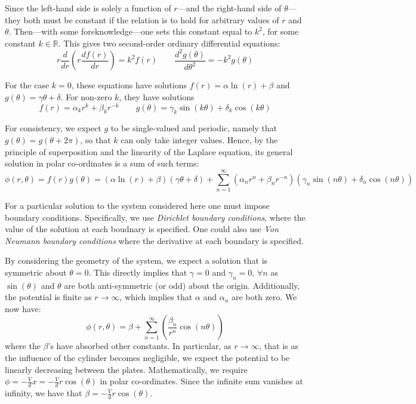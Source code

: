 \documentclass[12pt, a4paper]{article}
\newcommand{\be}{\begin{equation}}
\newcommand{\ee}{\end{equation}}
\begin{document}
Since the left-hand side is solely a function of $r$---and the right-hand side of
$\theta$---they both must be constant if the relation is to hold for arbitrary values
of $r$ and $\theta$. Then---with some foreknowledge---one sets this constant equal to
$k^2$, for some constant $k\in\mathbb{R}$. This gives two second-order ordinary
differential equations:
%
\be
r\frac{d}{dr}(r \frac{df(r)}{dr}) = k^2 f(r) \qquad
\frac{d^2 g(\theta)}{d\theta^2}=-k^2 g(\theta)
\ee

For the case $k=0$, these equations have solutions
$f(r)=\alpha \ln(r) + \beta$ and $g(\theta) = \gamma \theta + \delta$.
For non-zero $k$, they have solutions
%
\be
f(r)=\alpha_k r^k + \beta_k r^{-k}
\qquad
g(\theta)= \gamma_k \sin(k\theta)+\delta_k \cos(k\theta)
\ee

For consistency, we expect $g$ to be single-valued and periodic, namely that
$g(\theta)=g(\theta + 2\pi)$, so that $k$ can only take integer values. Hence, by
the principle of superposition and the linearity of the Laplace equation, its general
solution in polar co-ordinates is a sum of such terms:
%
\be
\phi(r,\theta)
= f(r)g(\theta)
= (\alpha \ln(r) + \beta)(\gamma\theta + \delta) + \sum_{n=1}^{\infty}(\alpha_n r^n+\beta_n r^{-n})(\gamma_n \sin(n\theta) + \delta_n \cos(n\theta))
\ee

For a particular solution to the system considered here one must impose boundary
conditions. Specifically, we use \emph{Dirichlet boundary conditions}, where the value
of the solution at each boudnary is specified. One could also use
\emph{Von Neumann boundary conditions} where the derivative at each boundary is
specified. 

By considering the geometry of the system, we expect a solution that is symmetric
about $\theta=0$. This directly implies that $\gamma = 0$ and $\gamma_n=0$, $\forall n$
as $\sin(\theta)$ and $\theta$ are both anti-symmetric (or odd) about the origin.
Additionally, the potential is finite as $r \rightarrow \infty$, which implies that
$\alpha$ and $\alpha_n$ are both zero. We now have:
%
\be
\phi(r,\theta)=\beta + \sum_{n=1}^{\infty}(\frac{\beta_n}{r^n} \cos(n\theta))
\ee
%
where the $\beta$'s have absorbed other constants. In particular, as
$r \rightarrow \infty$, that is as the influence of the cylinder becomes negligible,
we expect the potential to be linearly decreasing between the plates. Mathematically,
we require $\phi=-\frac{V}{d}x=-\frac{V}{d}r\cos(\theta)$ in polar co-ordinates.
Since the infinite sum vanishes at infinity, we have that
$\beta=-\frac{V}{d}r\cos(\theta)$.
\end{document}
